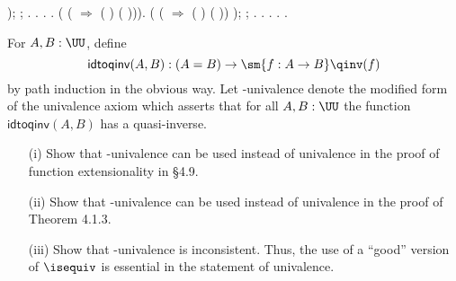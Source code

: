 \begin{coqdoccode}
\coqdocindent{14.50em}
\coqdocvar{\_} \coqdocvar{\_});\coqdoceol
\coqdocindent{1.00em}
; .\coqdoceol
\coqdocindent{1.00em}
 .  . .\coqdoceol
\coqdocemptyline
\coqdocindent{1.00em}
 ( (  \ensuremath{\Rightarrow} \coqdocnotation{(}  ( )\coqdocnotation{)}    \coqdocnotation{(}  ( )\coqdocnotation{)\^{}})).\coqdoceol
\coqdocindent{1.00em}
 ( \coqdocvar{\_} \coqdoceol
\coqdocindent{12.00em}
(  \ensuremath{\Rightarrow} \coqdocnotation{(}  ( )\coqdocnotation{)\^{}}    \coqdocnotation{(}  ( )\coqdocnotation{)}) \coqdoceol
\coqdocindent{12.00em}
\coqdocvar{\_} \coqdocvar{\_});\coqdoceol
\coqdocindent{1.00em}
; .\coqdoceol
\coqdocindent{1.00em}
 .  . .\coqdoceol
\coqdocnoindent
{}.\coqdoceol
\coqdocemptyline
\end{coqdoccode}
For $A, B : \UU$, define
\[
  \mathsf{idtoqinv}(A, B) : (A = B) \to \sm{f : A \to B} \qinv(f)
\]
by path induction in the obvious way.  Let \qinv-univalence denote the
modified form of the univalence axiom which asserts that for all $A, B : \UU$
the function $\mathsf{idtoqinv}(A, B)$ has a quasi-inverse.
\begin{itemize}
  \item[(i)] Show that \qinv-univalence can be used instead of univalence in
      the proof of function extensionality in \S4.9.
  \item[(ii)] Show that \qinv-univalence can be used instead of univalence in
      the proof of Theorem 4.1.3.
  \item[(iii)] Show that \qinv-univalence is inconsistent.  Thus, the use of a
      ``good'' version of $\isequiv$ is essential in the statement of
      univalence.
\end{itemize}


